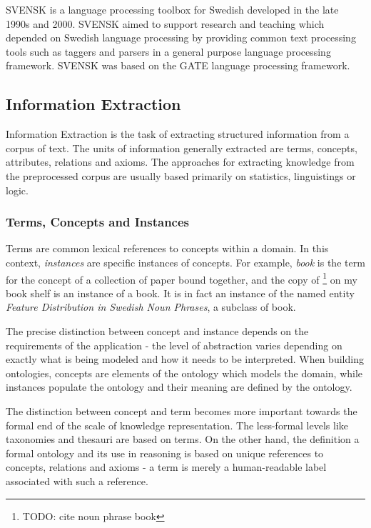\documentclass[a4paper]{report}
\newcommand{\todo}[1]{\footnote{{\color{red} TODO: #1}}}
\begin{document}
SVENSK is a language processing toolbox for Swedish developed in the late 1990s and 2000\cite{OlssonGamback00SVENSK}. SVENSK aimed to support research and teaching which depended on Swedish language processing by providing common text processing tools such as taggers and parsers in a general purpose language processing framework. SVENSK was based on the GATE language processing framework.

\subsection{Information Extraction}
\label{subsec:background:info_extraction}

Information Extraction is the task of extracting structured information from a corpus of text.
The units of information generally extracted are terms, concepts, attributes, relations and axioms.
The approaches for extracting knowledge from the preprocessed corpus are usually based primarily on statistics, linguistings or logic.

\subsubsection{Terms, Concepts and Instances}

Terms are common lexical references to concepts within a domain.
In this context, \emph{instances} are specific instances of concepts.
For example, \emph{book} is the term for the concept of a collection of paper bound together, and the copy of \todo{cite noun phrase book} on my book shelf is an instance of a book.
It is in fact an instance of the named entity \emph{Feature Distribution in Swedish Noun Phrases}, a subclass of book.

The precise distinction between concept and instance depends on the requirements of the application - the level of abstraction varies depending on exactly what is being modeled and how it needs to be interpreted.
When building ontologies, concepts are elements of the ontology which models the domain, while instances populate the ontology and their meaning are defined by the ontology.

The distinction between concept and term becomes more important towards the formal end of the scale of knowledge representation.
The less-formal levels like taxonomies and thesauri are based on terms.
On the other hand, the definition a formal ontology and its use in reasoning is based on unique references to concepts, relations and axioms - a term is merely a human-readable label associated with such a reference.
\end{document}
